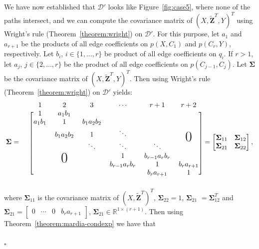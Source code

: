 \documentclass[11pt,a4paper]{article}
\newcommand\bigzero{\makebox(0,0){\text{\huge0}}}
\newenvironment{proofof}[1][]{\begin{trivlist}
   \item[\hskip \labelsep {\bfseries Proof of #1.}]}{\hfill{}$\square$\end{trivlist}}
\newcommand{\g}[1][G]{\mathcal{#1}}
\begin{document}
\begin{proofof}[Theorem~\ref{theorem:completeness ac}]
\begin{enumerate}[label=(\roman*)]
{We have now established that $\g[D']$ looks like Figure~\ref{fig:case5}, where none of the paths intersect, and we can compute the covariance  matrix of $(X,\mathbf{\tilde{Z}}^T,Y)^T$ using Wright's rule (Theorem~\ref{theorem:wright}) on $\g[D']$. For this purpose, let $a_1$ and $a_{r+1}$ be the products of all edge coefficients on $p(X,C_1)$ and  $p(C_r,Y)$, respectively. Let $b_i$, $i \in \{1,\dots,r\}$ be product of all edge coefficients on $q_i$. If $r>1$, let $a_{j}$, $j \in \{2,\dots,r\}$ be the product of all edge coefficients  on $p(C_{j-1},C_{j})$.
Let $\mathbf{\Sigma}$ be the covariance matrix of $(X,\mathbf{\tilde{Z}}^T,Y)^T$. Then using Wright's rule (Theorem~\ref{theorem:wright}) on $\g[D']$ yields:
\[ \mathbf{\Sigma} =
\begin{blockarray}{ccccccc}
     	&1	   		&2 				& 3 		& \cdots 		& r+1 			&  r+2  		\\
\begin{block}{c[cccccc]}
      	& 1   		&  a_1b_1  		&  	  		&      			&  	   			&      			\\
      	& a_1b_1	&  1   			& b_1a_2b_2	&      			&    			&  				\\
      	&      		&  b_1a_2b_2 	& 1  		&  \ddots   	&       		& \bigzero  	\\
		&  			&      			& \ddots   	&  \ddots 		&  \ddots   	&  				\\
   		&       	&  \bigzero  	&        	& 1				& b_{r-1}a_rb_r	& 				\\
   		&       	&  			  	&        	& b_{r-1}a_rb_r	&  1        	& b_ra_{r+1}	\\
   		&       	&      			&        	&        		& b_ra_{r+1}	& 1				\\
\end{block}
\end{blockarray}
=
 \begin{bmatrix}
        \mathbf{\Sigma}_{11} & \mathbf{\Sigma}_{12}  	\\
      	\mathbf{\Sigma}_{21} & \mathbf{\Sigma}_{22}
   \end{bmatrix},
 \]
where $\mathbf{\Sigma}_{11}$ is the covariance matrix of $(X,\mathbf{\tilde{Z}}^T)^T$, $\mathbf{\Sigma}_{22} =1$, $\mathbf{\Sigma}_{21}$ $= \mathbf{\Sigma}^{T}_{12}$ and $\mathbf{\Sigma}_{21}= \begin{bmatrix}
0 & \cdots & 0 & b_ra_{r+1} 
\end{bmatrix}$, $\mathbf{\Sigma}_{21} \in \mathbb{R}^{1 \times (r+1)}$.
Then using Theorem~\ref{theorem:mardia-condexp} we have that
\begin{align*}

\end{align*}}
\end{enumerate}
\end{proofof}
\end{document}
